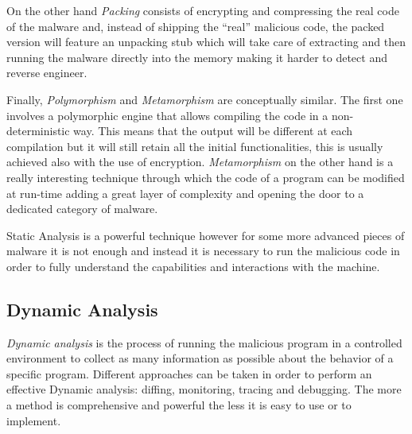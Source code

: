 On the other hand \textit{Packing} consists of encrypting and compressing the real code of the malware and, instead of shipping the ``real'' malicious code, the packed version will feature an unpacking stub which will take care of extracting and then running the malware directly into the memory making it harder to detect and reverse engineer.

Finally, \textit{Polymorphism} and \textit{Metamorphism} are conceptually similar. The first one involves a polymorphic engine that allows compiling the code in a non-deterministic way. This means that the output will be different at each compilation but it will still retain all the initial functionalities, this is usually achieved also with the use of encryption. \textit{Metamorphism} on the other hand is a really interesting technique through which the code of a program can be modified at run-time adding a great layer of complexity and opening the door to a dedicated category of malware.

Static Analysis is a powerful technique however for some more advanced pieces of malware it is not enough and instead it is necessary to run the malicious code in order to fully understand the capabilities and interactions with the machine.


\subsection*{Dynamic Analysis}

\textit{Dynamic analysis} is the process of running the malicious program in a controlled environment to collect as many information as possible about the behavior of a specific program. Different approaches can be taken in order to perform an effective Dynamic analysis: diffing, monitoring, tracing and debugging. The more a method is comprehensive and powerful the less it is easy to use or to implement.

